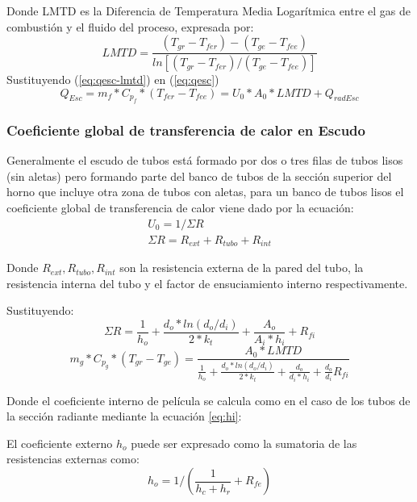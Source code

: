 \par Donde LMTD es la Diferencia de Temperatura Media Logarítmica entre el gas de combustión y el fluido del proceso, expresada por:
\begin{equation}
\label{eq:lmtd}
   LMTD = \frac{(T_{gr}-T_{fer}) - (T_{ge}-T_{fee})}
   {ln[(T_{gr}-T_{fer}) /(T_{ge}-T_{fee})]}
\end{equation}
Sustituyendo (\ref{eq:qesc-lmtd}) en (\ref{eq:qesc})
\begin{equation}
\label{eq:tesc}
  Q_{Esc} = m_{f} *C_{p_f} *(T_{fer} - T_{fee}) = U_0 *A_0 *LMTD + Q_{radEsc}
\end{equation}

\subsubsection{Coeficiente global de transferencia de calor en Escudo}
\par Generalmente el escudo de tubos está formado por dos o tres filas de tubos lisos (sin aletas) pero formando parte del banco de tubos de la sección superior del horno que incluye otra zona de tubos con aletas, para un banco de tubos lisos el coeficiente global de transferencia de calor viene dado por la ecuación:
\begin{gather*}
\label{}
U_0  = 1 / \Sigma R \\
\Sigma R = R_{ext} + R_{tubo} + R_{int}
\end{gather*}
\par Donde $R_{ext}, R_{tubo}, R_{int}$ son la resistencia externa de la pared del tubo, la resistencia interna del tubo y el factor de ensuciamiento interno respectivamente.
\par Sustituyendo:
\begin{equation}
\label{}
\Sigma R = \frac{1}{h_o} +\frac{d_o*ln(d_o/d_i)}{2*k_t} +\frac{A_o}{A_i*h_i} +R_{fi}
\end{equation}
\begin{equation}
\label{}
m_{g} *C_{p_g} *(T_{gr} - T_{ge}) = \frac{A_0 *LMTD}
{\frac{1}{h_o} +\frac{d_o*ln(d_o/d_i)}{2*k_t} +\frac{d_o}{d_i*h_i} +\frac{d_o}{d_i}R_{fi}}
\end{equation}
\par Donde el coeficiente interno de película se calcula como en el caso de los tubos de la sección radiante mediante la ecuación \ref{eq:hi}:
\par El coeficiente externo $h_o$ puede ser expresado como la sumatoria de las resistencias externas como:
\begin{equation}
\label{eq:ho}
h_o = 1/(\frac{1}{h_c + h_{r}} + R_{fe})
\end{equation}
